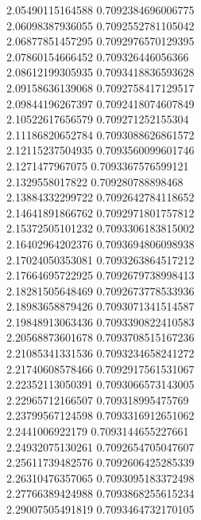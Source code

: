 {2.05490115164588 0.7092384696006775
 \\
2.06098387936055 0.7092552781105042
 \\
2.06877851457295 0.7092976570129395
 \\
2.07860154666452 0.709326446056366
 \\
2.08612199305935 0.7093418836593628
 \\
2.09158636139068 0.7092758417129517
 \\
2.09844196267397 0.7092418074607849
 \\
2.10522617656579 0.709271252155304
 \\
2.11186820652784 0.7093088626861572
 \\
2.12115237504935 0.7093560099601746
 \\
2.1271477967075 0.7093367576599121
 \\
2.1329558017822 0.709280788898468
 \\
2.13884332299722 0.7092642784118652
 \\
2.14641891866762 0.7092971801757812
 \\
2.15372505101232 0.7093306183815002
 \\
2.16402964202376 0.7093694806098938
 \\
2.17024050353081 0.7093263864517212
 \\
2.17664695722925 0.7092679738998413
 \\
2.18281505648469 0.7092673778533936
 \\
2.18983658879426 0.7093071341514587
 \\
2.19848913063436 0.7093390822410583
 \\
2.20568873601678 0.7093708515167236
 \\
2.21085341331536 0.7093234658241272
 \\
2.21740608578466 0.7092917561531067
 \\
2.22352113050391 0.7093066573143005
 \\
2.22965712166507 0.709318995475769
 \\
2.23799567124598 0.7093316912651062
 \\
2.2441006922179 0.7093144655227661
 \\
2.24932075130261 0.7092654705047607
 \\
2.25611739482576 0.7092606425285339
 \\
2.26310476357065 0.7093095183372498
 \\
2.27766389424988 0.7093868255615234
 \\
2.29007505491819 0.7093464732170105
 \\
}
